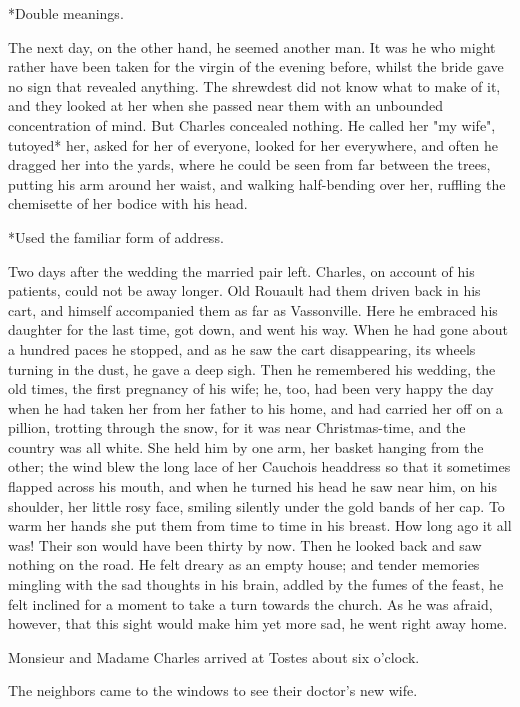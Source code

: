 \documentclass[11pt,twocolumn]{ltugboat}
\begin{document}
     *Double meanings.

The next day, on the other hand, he seemed another man. It was he who
might rather have been taken for the virgin of the evening before,
whilst the bride gave no sign that revealed anything. The shrewdest did
not know what to make of it, and they looked at her when she passed
near them with an unbounded concentration of mind. But Charles concealed
nothing. He called her "my wife", tutoyed* her, asked for her of
everyone, looked for her everywhere, and often he dragged her into the
yards, where he could be seen from far between the trees, putting his
arm around her waist, and walking half-bending over her, ruffling the
chemisette of her bodice with his head.

     *Used the familiar form of address.

Two days after the wedding the married pair left. Charles, on account of
his patients, could not be away longer. Old Rouault had them driven back
in his cart, and himself accompanied them as far as Vassonville. Here
he embraced his daughter for the last time, got down, and went his way.
When he had gone about a hundred paces he stopped, and as he saw the
cart disappearing, its wheels turning in the dust, he gave a deep sigh.
Then he remembered his wedding, the old times, the first pregnancy of
his wife; he, too, had been very happy the day when he had taken her
from her father to his home, and had carried her off on a pillion,
trotting through the snow, for it was near Christmas-time, and the
country was all white. She held him by one arm, her basket hanging from
the other; the wind blew the long lace of her Cauchois headdress so that
it sometimes flapped across his mouth, and when he turned his head he
saw near him, on his shoulder, her little rosy face, smiling silently
under the gold bands of her cap. To warm her hands she put them from
time to time in his breast. How long ago it all was! Their son would
have been thirty by now. Then he looked back and saw nothing on the
road. He felt dreary as an empty house; and tender memories mingling
with the sad thoughts in his brain, addled by the fumes of the feast, he
felt inclined for a moment to take a turn towards the church. As he was
afraid, however, that this sight would make him yet more sad, he went
right away home.

Monsieur and Madame Charles arrived at Tostes about six o'clock.

The neighbors came to the windows to see their doctor's new wife.
\end{document}

